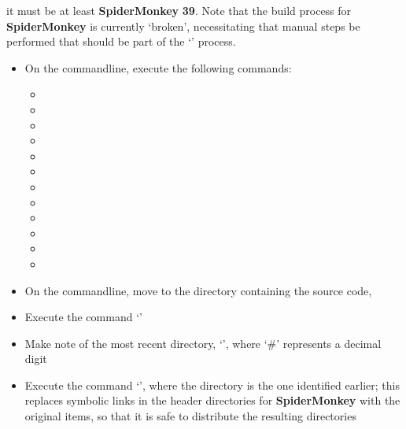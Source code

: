 it must be at least \textbf{SpiderMonkey} \textbf{39}.
Note that the build process for \textbf{SpiderMonkey} is currently `broken', necessitating
that manual steps be performed that should be part of the `' process.
\begin{itemize}
\item On the command\longDash{}line, execute the following commands:
\begin{itemize}
\item {}
\item\exSp{}
\item\exSp{}
\item\exSp{}
\item\exSp{}
\item\exSp{}
\item\exSp{}
\item\exSp{}
\item\exSp{}
\item\exSp{}
\item\exSp{}
\item\exSp{}
\end{itemize}
\item\exSp{}On the command\longDash{}line, move to the directory containing the \mplusm{}
source code, 
\item\exSp{}Execute the command `'
\item\exSp{}Make note of the most recent directory, `',
where `\#' represents a decimal digit
\item\exSp{}Execute the command `', where the directory is the one
identified earlier;
this replaces symbolic links in the header directories for \textbf{SpiderMonkey} with the
original items, so that it is safe to distribute the resulting directories
\end{itemize}
